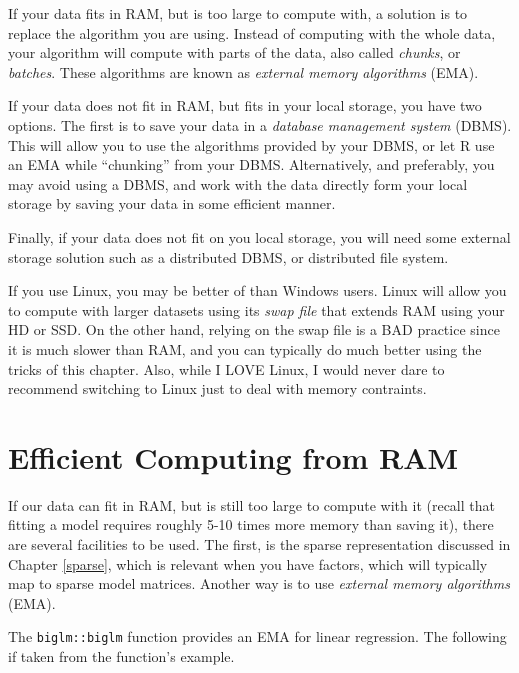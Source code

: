 \documentclass[]{book}
\theoremstyle{definition}
\theoremstyle{definition}
\theoremstyle{definition}
\theoremstyle{remark}
\let\BeginKnitrBlock\begin \let\EndKnitrBlock\end
\begin{document}
If your data fits in RAM, but is too large to compute with, a solution
is to replace the algorithm you are using. Instead of computing with the
whole data, your algorithm will compute with parts of the data, also
called \emph{chunks}, or \emph{batches}. These algorithms are known as
\emph{external memory algorithms} (EMA).

If your data does not fit in RAM, but fits in your local storage, you
have two options. The first is to save your data in a \emph{database
management system} (DBMS). This will allow you to use the algorithms
provided by your DBMS, or let R use an EMA while ``chunking'' from your
DBMS. Alternatively, and preferably, you may avoid using a DBMS, and
work with the data directly form your local storage by saving your data
in some efficient manner.

Finally, if your data does not fit on you local storage, you will need
some external storage solution such as a distributed DBMS, or
distributed file system.

\BeginKnitrBlock{remark}
{}If you use Linux, you may be better of than
Windows users. Linux will allow you to compute with larger datasets
using its \emph{swap file} that extends RAM using your HD or SSD. On the
other hand, relying on the swap file is a BAD practice since it is much
slower than RAM, and you can typically do much better using the tricks
of this chapter. Also, while I LOVE Linux, I would never dare to
recommend switching to Linux just to deal with memory contraints.
\EndKnitrBlock{remark}

\section{Efficient Computing from
RAM}\label{efficient-computing-from-ram}

If our data can fit in RAM, but is still too large to compute with it
(recall that fitting a model requires roughly 5-10 times more memory
than saving it), there are several facilities to be used. The first, is
the sparse representation discussed in Chapter \ref{sparse}, which is
relevant when you have factors, which will typically map to sparse model
matrices. Another way is to use \emph{external memory algorithms} (EMA).

The \texttt{biglm::biglm} function provides an EMA for linear
regression. The following if taken from the function's example.
\end{document}

